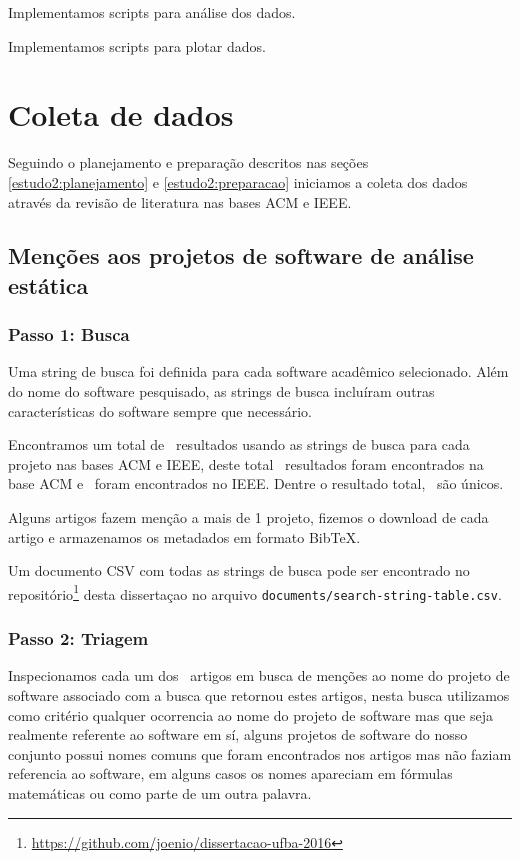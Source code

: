 

Implementamos scripts para análise dos dados.

Implementamos scripts para plotar dados.


\section{Coleta de dados}

Seguindo o planejamento e preparação descritos nas seções
\ref{estudo2:planejamento} e \ref{estudo2:preparacao} iniciamos a coleta dos
dados através da revisão de literatura nas bases ACM e IEEE.

\subsection{Menções aos projetos de software de análise estática}



\subsubsection{Passo 1: Busca}

Uma string de busca foi definida para cada software acadêmico selecionado.
Além do nome do software pesquisado, as strings de busca incluíram outras
características do software sempre que necessário.

Encontramos um total de \SearchCount \ resultados usando as strings de busca
para cada projeto nas bases ACM e IEEE, deste total \SearchACMCount \
resultados foram encontrados na base ACM e \SearchIEEECount \ foram encontrados
no IEEE.  Dentre o resultado total, \SearchUniqueCount \ são únicos.

Alguns artigos fazem menção a mais de 1 projeto, fizemos o download de cada
artigo e armazenamos os metadados em formato BibTeX.

Um documento CSV com todas as strings de busca pode ser encontrado no
repositório\footnote{\url{https://github.com/joenio/dissertacao-ufba-2016}}
desta dissertaçao no arquivo \texttt{documents/search-string-table.csv}.

\subsubsection{Passo 2: Triagem}

Inspecionamos cada um dos \SearchUniqueCount \ artigos em busca de menções ao
nome do projeto de software associado com a busca que retornou estes artigos,
nesta busca utilizamos como critério qualquer ocorrencia ao nome do projeto de
software mas que seja realmente referente ao software em sí, alguns projetos de
software do nosso conjunto possui nomes comuns que foram encontrados nos
artigos mas não faziam referencia ao software, em alguns casos os nomes
apareciam em fórmulas matemáticas ou como parte de um outra palavra.

